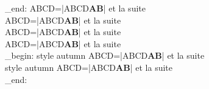 \group_end:
\ExplSyntaxOff
{}
ABCD=\CDRCode|ABCD\textbf{AB}| et la suite\\
ABCD=\CDRCode[style=autumn]|ABCD\textbf{AB}| et la suite\\
ABCD=\CDRCode[cache=true]|ABCD\textbf{AB}| et la suite\\
ABCD=\CDRCode[cache=true,debug=true]|ABCD\textbf{AB}| et la suite\\
\ExplSyntaxOn
\group_begin:
\ExplSyntaxOff
{}
style autumn ABCD=\CDRCode[tag=X]|ABCD\textbf{AB}| et la suite\\
style autumn ABCD=\CDRCode[tag=Y]|ABCD\textbf{AB}| et la suite\\
\ExplSyntaxOn
\group_end:
\ExplSyntaxOff
{}
